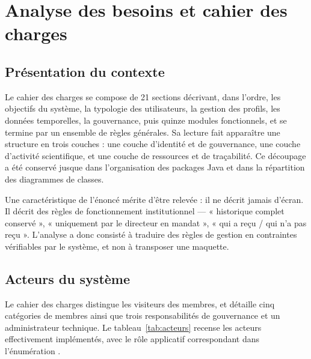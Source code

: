 \chapter{Analyse des besoins et cahier des charges}
\label{ch:besoins}

\section{Présentation du contexte}

Le cahier des charges se compose de 21 sections décrivant, dans l'ordre, les objectifs du
système, la typologie des utilisateurs, la gestion des profils, les données temporelles,
la gouvernance, puis quinze modules fonctionnels, et se termine par un ensemble de règles
générales. Sa lecture fait apparaître une structure en trois couches : une couche
d'identité et de gouvernance, une couche d'activité scientifique, et une couche de
ressources et de traçabilité. Ce découpage a été conservé jusque dans l'organisation des
packages Java et dans la répartition des diagrammes de classes.

Une caractéristique de l'énoncé mérite d'être relevée : il ne décrit jamais d'écran. Il
décrit des règles de fonctionnement institutionnel --- « historique complet conservé »,
« uniquement par le directeur en mandat », « qui a reçu / qui n'a pas reçu ». L'analyse a
donc consisté à traduire des règles de gestion en contraintes vérifiables par le système,
et non à transposer une maquette.

\section{Acteurs du système}

Le cahier des charges distingue les visiteurs des membres, et détaille cinq catégories de
membres ainsi que trois responsabilités de gouvernance et un administrateur technique. Le
tableau~\ref{tab:acteurs} recense les acteurs effectivement implémentés, avec le rôle
applicatif correspondant dans l'énumération .

